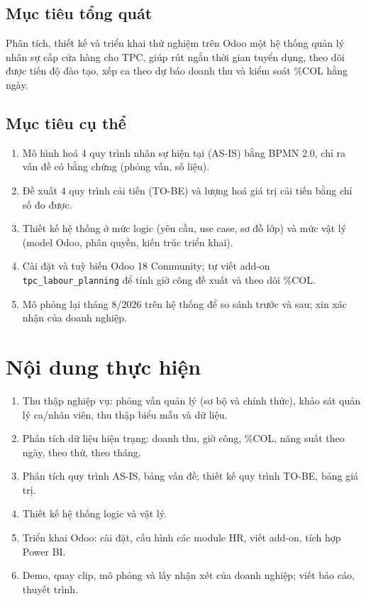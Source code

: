 \documentclass[12pt,a4paper,oneside]{report}
\begin{document}
\subsection{Mục tiêu tổng quát}
Phân tích, thiết kế và triển khai thử nghiệm trên Odoo một hệ thống quản lý nhân sự cấp cửa hàng cho TPC, giúp rút ngắn thời gian tuyển dụng, theo dõi được tiến độ đào tạo, xếp ca theo dự báo doanh thu và kiểm soát \%COL hằng ngày.

\subsection{Mục tiêu cụ thể}
\begin{enumerate}
\item Mô hình hoá 4 quy trình nhân sự hiện tại (AS-IS) bằng BPMN 2.0, chỉ ra vấn đề có bằng chứng (phỏng vấn, số liệu).
\item Đề xuất 4 quy trình cải tiến (TO-BE) và lượng hoá giá trị cải tiến bằng chỉ số đo được.
\item Thiết kế hệ thống ở mức logic (yêu cầu, use case, sơ đồ lớp) và mức vật lý (model Odoo, phân quyền, kiến trúc triển khai).
\item Cài đặt và tuỳ biến Odoo 18 Community; tự viết add-on \texttt{tpc\_labour\_planning} để tính giờ công đề xuất và theo dõi \%COL.
\item Mô phỏng lại tháng 8/2026 trên hệ thống để so sánh trước và sau; xin xác nhận của doanh nghiệp.
\end{enumerate}

\section{Nội dung thực hiện}
\begin{enumerate}
\item Thu thập nghiệp vụ: phỏng vấn quản lý (sơ bộ và chính thức), khảo sát quản lý ca/nhân viên, thu thập biểu mẫu và dữ liệu.
\item Phân tích dữ liệu hiện trạng: doanh thu, giờ công, \%COL, năng suất theo ngày, theo thứ, theo tháng.
\item Phân tích quy trình AS-IS, bảng vấn đề; thiết kế quy trình TO-BE, bảng giá trị.
\item Thiết kế hệ thống logic và vật lý.
\item Triển khai Odoo: cài đặt, cấu hình các module HR, viết add-on, tích hợp Power BI.
\item Demo, quay clip, mô phỏng và lấy nhận xét của doanh nghiệp; viết báo cáo, thuyết trình.
\end{enumerate}
\end{document}
